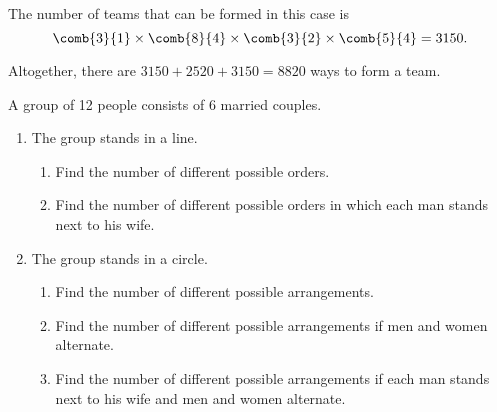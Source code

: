 \begin{solution}
\begin{ppart}
        The number of teams that can be formed in this case is \[\comb{3}{1} \times \comb{8}{4} \times \comb{3}{2} \times \comb{5}{4} = 3150.\]

        Altogether, there are $3150 + 2520 + 3150 = 8820$ ways to form a team.
    \end{ppart}
\end{solution}

\clearpage
\begin{problem}
    A group of 12 people consists of 6 married couples.
    
    \begin{enumerate}
        \item The group stands in a line.
        \begin{enumerate}
            \item Find the number of different possible orders.
            \item Find the number of different possible orders in which each man stands next to his wife.
        \end{enumerate}
        \item The group stands in a circle.
        \begin{enumerate}
            \item Find the number of different possible arrangements.
            \item Find the number of different possible arrangements if men and women alternate.
            \item Find the number of different possible arrangements if each man stands next to his wife and men and women alternate.
        \end{enumerate}
    \end{enumerate}
\end{problem}
